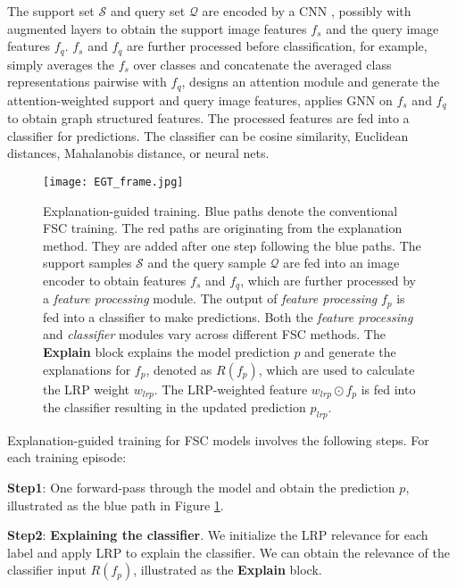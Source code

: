 \documentclass[a4paper,conference]{IEEEtran}
\begin{document}
The support set $\mathcal{S}$ and query set $\mathcal{Q}$ are encoded by a CNN \cite{RN:sung2018learning, CAN:hou2019cross}, possibly with augmented layers \cite{TADAM:oreshkin2018tadam, FeaturewiseTranslayer:tseng2020cross} to obtain the support image features $f_s$ and the query image features $f_q$. $f_s$ and $f_q$ are further processed before classification, for example,  \cite{RN:sung2018learning} simply averages the $f_s$ over classes and concatenate the averaged class representations pairwise with $f_q$, \cite{CAN:hou2019cross} designs an attention module and generate the attention-weighted support and query image features, \cite{TPN:liu2018learning} applies GNN on $f_s$ and $f_q$ to obtain graph structured features. 
The processed features are fed into a classifier for predictions. The classifier can be cosine similarity\cite{CAN:hou2019cross}, Euclidean distances\cite{PROTO:snell2017prototypical}, Mahalanobis distance\cite{SIMPLECANPS:bateni2020improved}, or neural nets\cite{RN:sung2018learning, FEWGNN:garcia2018fewshot}.
\begin{figure}[tb]
    \centering
    \texttt{[image: EGT\_frame.jpg]}
    \caption{Explanation-guided training. Blue paths denote the conventional FSC training. The red paths are originating from the explanation  method. They are added after one step following the blue paths. The support samples $\mathcal{S}$ and the query sample $\mathcal{Q}$ are fed into an image encoder to obtain features $f_s$ and $f_q$, which are further processed by a \textit{feature processing} module. The output of \textit{feature processing} $f_p$ is fed into a classifier to make predictions. Both the \textit{feature processing} and \textit{classifier} modules vary across different FSC methods. The \textbf{Explain} block explains the model prediction $p$ and generate the explanations for $f_p$, denoted as $R(f_p)$, which are used to calculate the LRP weight $w_{lrp}$. The LRP-weighted feature $w_{lrp} \odot f_p$ is fed into the classifier resulting in the updated prediction $p_{lrp}$.}
    \label{fig:EGT_frame}
\end{figure}

Explanation-guided training for FSC models involves the following steps. For each training episode:

\textbf{Step1}: One forward-pass through the model and obtain the prediction $p$, illustrated as the blue path in Figure \ref{fig:EGT_frame}.

\textbf{Step2}: \textbf{Explaining the classifier}. We initialize the LRP relevance for each label and apply LRP to explain the classifier. We can obtain the relevance of the classifier input $R(f_p)$, illustrated as the \textbf{Explain} block. 
\end{document}
